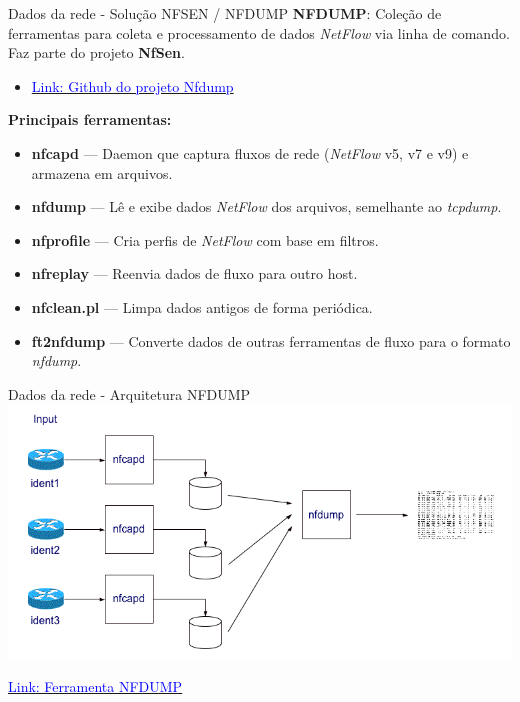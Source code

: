 \begin{frame}{Dados da rede - Solução NFSEN / NFDUMP}
    \textbf{NFDUMP}: Coleção de ferramentas para coleta e processamento de dados \textit{NetFlow} via linha de comando.  
    Faz parte do projeto \textbf{NfSen}. 

    \begin{itemize}
        \item  \href{https://github.com/phaag/nfdump}{\textcolor{blue}{Link: Github do projeto Nfdump}}
    \end{itemize}

   
    
    \vspace{0.3cm}
    \textbf{Principais ferramentas:}
    \begin{itemize}
        \item \textbf{nfcapd} — Daemon que captura fluxos de rede (\textit{NetFlow} v5, v7 e v9) e armazena em arquivos.
        \item \textbf{nfdump} — Lê e exibe dados \textit{NetFlow} dos arquivos, semelhante ao \textit{tcpdump}.
        \item \textbf{nfprofile} — Cria perfis de \textit{NetFlow} com base em filtros.
        \item \textbf{nfreplay} — Reenvia dados de fluxo para outro host.
        \item \textbf{nfclean.pl} — Limpa dados antigos de forma periódica.
        \item \textbf{ft2nfdump} — Converte dados de outras ferramentas de fluxo para o formato \textit{nfdump}.
    \end{itemize}
\end{frame}




\begin{frame}{Dados da rede - Arquitetura NFDUMP}
    \centering
    \includegraphics[width=0.85\linewidth]{Figuras/nfdump.png}
    \vspace{0.3cm}


\href{https://nfdump.sourceforge.net/}{\textcolor{blue}{Link: Ferramenta NFDUMP}}

\end{frame}

